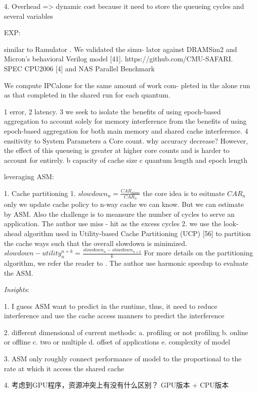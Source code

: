 \documentclass[UTF8]{article}
\begin{document}
4. Overhead => dynamic cost because it need to store the queueing cycles and several variables

EXP:

similar to Ramulator \cite{kim2015ramulator}. We validated the simu- lator against DRAMSim2 \cite{rosenfeld2011dramsim2} and Micron’s behavioral Verilog model [41]. https://github.com/CMU-SAFARI. SPEC CPU2006 [4] and NAS Parallel Benchmark

We compute IPCalone for the same amount of work com- pleted in the alone run as that completed in the shared run for each quantum.

1 error,  2 latency. 3 we seek to isolate the benefits of using epoch-based aggregation to account solely for memory interference from the benefits of using epoch-based aggregation for both main memory and shared cache interference. 4 ensitivity to System Parameters a Core count. why accuracy decrease? However, the effect of this queueing is greater at higher core counts and is harder to account for entirely. b capacity of cache size c quantum length and epoch length

leveraging ASM:

1. Cache partitioning 1. $slowdown_n = \frac{CAR_{alone}}{CAR_n}$  the core idea is to esitmate $CAR_n$ only we update cache policy to n-way cache we can know. But we can estimate by ASM. Also the challenge is to meansure the number of cycles to serve an application. The author use miss - hit as the excess cycles 2. we use the look-ahead algorithm used in Utility-based Cache Partitioning (UCP) [56] to partition the cache ways such that the overall slowdown is minimized. $slowdown-utility^{n+k}_n = \frac{slowdown_n - slowdown_{n+k}}{k}$  For more details on the partitioning algorithm, we refer the reader to \cite{qureshi2006utility}. The author use harmonic speedup to evaluate the ASM.


\emph{Insights}: 

1. I guess ASM want to predict in the runtime, thus, it need to reduce interference and use the cache access manners to predict the interference 

2. different dimensional of current methods: a. profiling or not profiling b. online or offline c. two or multiple d. offset of applications e. complexity of model 

3. ASM only roughly connect performance of model to the proportional to the rate at which it access the shared cache 

4. 考虑到GPU程序，资源冲突上有没有什么区别？ GPU版本 + CPU版本 
\end{document}
